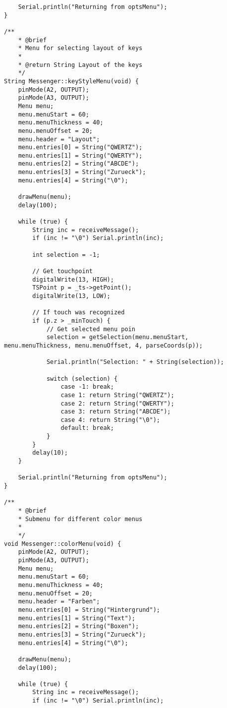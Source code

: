 \documentclass[a4paper, 11pt]{scrartcl}
\begin{document}
\begin{lstlisting}
    Serial.println("Returning from optsMenu");
}

/**
    * @brief 
    * Menu for selecting layout of keys
    * 
    * @return String Layout of the keys
    */
String Messenger::keyStyleMenu(void) {
    pinMode(A2, OUTPUT);
    pinMode(A3, OUTPUT);
    Menu menu;
    menu.menuStart = 60;
    menu.menuThickness = 40;
    menu.menuOffset = 20;
    menu.header = "Layout";
    menu.entries[0] = String("QWERTZ");
    menu.entries[1] = String("QWERTY");
    menu.entries[2] = String("ABCDE");
    menu.entries[3] = String("Zurueck");
    menu.entries[4] = String("\0");

    drawMenu(menu);
    delay(100);

    while (true) {
        String inc = receiveMessage();
        if (inc != "\0") Serial.println(inc);
        
        int selection = -1;
        
        // Get touchpoint
        digitalWrite(13, HIGH);
        TSPoint p = _ts->getPoint();
        digitalWrite(13, LOW);

        // If touch was recognized
        if (p.z > _minTouch) {
            // Get selected menu poin
            selection = getSelection(menu.menuStart, menu.menuThickness, menu.menuOffset, 4, parseCoords(p));

            Serial.println("Selection: " + String(selection));
            
            switch (selection) {
                case -1: break;
                case 1: return String("QWERTZ");
                case 2: return String("QWERTY");
                case 3: return String("ABCDE");
                case 4: return String("\0");
                default: break;
            }
        }
        delay(10);
    }

    Serial.println("Returning from optsMenu");
}

/**
    * @brief 
    * Submenu for different color menus
    * 
    */
void Messenger::colorMenu(void) {
    pinMode(A2, OUTPUT);
    pinMode(A3, OUTPUT);
    Menu menu;
    menu.menuStart = 60;
    menu.menuThickness = 40;
    menu.menuOffset = 20;
    menu.header = "Farben";
    menu.entries[0] = String("Hintergrund");
    menu.entries[1] = String("Text");
    menu.entries[2] = String("Boxen");
    menu.entries[3] = String("Zurueck");
    menu.entries[4] = String("\0");

    drawMenu(menu);
    delay(100);

    while (true) {
        String inc = receiveMessage();
        if (inc != "\0") Serial.println(inc);
        

\end{lstlisting}
\end{document}
